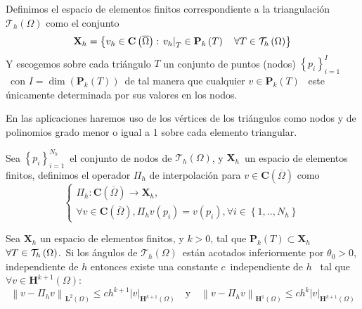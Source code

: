 \begin{defi}
	Definimos el espacio de elementos finitos correspondiente a la
	triangulación $\mathcal{T}_{h}\left( \Omega \right) $ como el conjunto
	\[
	\mathbf{X}_{h}=\left\{ v_{h}\in \mathbf{C}\left( \overline{\Omega }\right)
	:\left.v_{h}\right\vert _{T}\in \mathbf{P}_{k}\left( T\right) \quad \forall T\in \mathcal{%
		T}_{h}\left( \Omega \right) \right\}
	\]
	Y escogemos sobre cada triángulo $T$ un conjunto de puntos (nodos) $\left\{
	p_{i}\right\} _{i=1}^{I}$\ con $I=\dim \left( \mathbf{P}_{k}\left( T\right)
	\right) $\ de tal manera que cualquier $v\in \mathbf{P}_{k}\left( T\right) $%
	\ este únicamente determinada por sus valores en los nodos.
\end{defi}
En las aplicaciones haremos uso de los vértices de los triángulos
como nodos y de polinomios grado menor o igual a 1 sobre cada elemento
triangular.
\begin{defi}[Interpolación]
	Sea $\left\{ p_{i}\right\} _{i=1}^{N_{h}}$\ el conjunto de nodos de $%
	\mathcal{T}_{h}\left( \Omega \right) $, y $\mathbf{X}_{h}$\ un espacio de
	elementos finitos, definimos el operador $\Pi _{h}$ de interpolación
	para $v\in \mathbf{C}\left( \overline{\Omega }\right) $ como
	\[
	\left\{
	\begin{array}{l}
		\Pi _{h}:\mathbf{C}\left( \overline{\Omega }\right) \rightarrow \mathbf{X}%
		_{h}, \\
		\forall v\in \mathbf{C}\left( \overline{\Omega }\right) ,\Pi _{h}v\left( p_{i}\right) =v\left( p_{i}\right) ,\forall i\in \left\{
		1,..,N_{h}\right\}
	\end{array}
	\right.
	\]
\end{defi}

\begin{teo}
	Sea $\mathbf{X}_{h}$ un espacio de elementos finitos, y $k>0$, tal que $%
	\mathbf{P}_{k}\left( T\right) \subset \mathbf{X}_{h}$ $\forall T\in \mathcal{%
		T}_{h}\left( \Omega \right) $.\ Si los ángulos de $\mathcal{T}_{h}\left(
	\Omega \right) $\ están acotados inferiormente por $\theta _{0}>0$,
	independiente de $h$ entonces existe una constante $c$\ independiente de $h$%
	\ tal que $\forall v\in \mathbf{H}^{k+1}\left( \Omega \right) $:
	\[
	\left\| v-\Pi _{h}v\right\| _{\mathbf{L}^{2}\left( \Omega \right) }\leqslant
	ch^{k+1}\left| v\right| _{\mathbf{H}^{k+1}\left( \Omega \right) }\quad\text{y}\quad
	\left\| v-\Pi _{h}v\right\| _{\mathbf{H}^{1}\left( \Omega \right) }\leqslant
	ch^{k}\left| v\right| _{\mathbf{H}^{k+1}\left( \Omega \right) }
	\]
\end{teo}




